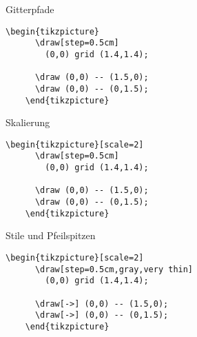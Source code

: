 \begin{Frame}[t,fragile]{Gitterpfade}

  \xxx

  \begin{lstlisting}[gobble=4]
    \begin{tikzpicture}
      \draw[step=0.5cm]
        (0,0) grid (1.4,1.4);

      \draw (0,0) -- (1.5,0);
      \draw (0,0) -- (0,1.5);
    \end{tikzpicture}
  \end{lstlisting}
\end{Frame}

\begin{Frame}[t,fragile]{Skalierung}

  \xxx

  \begin{lstlisting}[gobble=4]
    \begin{tikzpicture}[scale=2]
      \draw[step=0.5cm]
        (0,0) grid (1.4,1.4);

      \draw (0,0) -- (1.5,0);
      \draw (0,0) -- (0,1.5);
    \end{tikzpicture}
  \end{lstlisting}
\end{Frame}

\begin{Frame}[t,fragile]{Stile und Pfeilspitzen}

  \xxx

  \begin{lstlisting}[gobble=4]
    \begin{tikzpicture}[scale=2]
      \draw[step=0.5cm,gray,very thin]
        (0,0) grid (1.4,1.4);

      \draw[->] (0,0) -- (1.5,0);
      \draw[->] (0,0) -- (0,1.5);
    \end{tikzpicture}
  \end{lstlisting}
\end{Frame}


